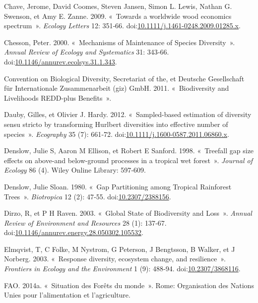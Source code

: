 \documentclass[11pt,french,A4paper,extrafontsizes,onecolumn,openright]{memoir}
\begin{document}
\hypertarget{ref-Chave2009}{}
Chave, Jerome, David Coomes, Steven Jansen, Simon L. Lewis, Nathan G.
Swenson, et Amy E. Zanne. 2009. «~Towards a worldwide wood economics
spectrum~». \emph{Ecology Letters} 12: 351‑66.
doi:\href{https://doi.org/10.1111/j.1461-0248.2009.01285.x}{10.1111/j.1461-0248.2009.01285.x}.

\hypertarget{ref-Chesson2000}{}
Chesson, Peter. 2000. «~Mechanisms of Maintenance of Species
Diversity~». \emph{Annual Review of Ecology and Systematics} 31: 343‑66.
doi:\href{https://doi.org/10.1146/annurev.ecolsys.31.1.343}{10.1146/annurev.ecolsys.31.1.343}.

\hypertarget{ref-CBDdiversity2011}{}
Convention on Biological Diversity, Secretariat of the, et Deutsche
Gesellschaft für Internationale Zusammenarbeit (giz) GmbH. 2011.
«~Biodiversity and Livelihoods REDD-plus Benefits~».

\hypertarget{ref-Dauby2012}{}
Dauby, Gilles, et Olivier J. Hardy. 2012. «~Sampled-based estimation of
diversity sensu stricto by transforming Hurlbert diversities into
effective number of species~». \emph{Ecography} 35 (7): 661‑72.
doi:\href{https://doi.org/10.1111/j.1600-0587.2011.06860.x}{10.1111/j.1600-0587.2011.06860.x}.

\hypertarget{ref-Denslow1998}{}
Denslow, Julie S, Aaron M Ellison, et Robert E Sanford. 1998. «~Treefall
gap size effects on above-and below-ground processes in a tropical wet
forest~». \emph{Journal of Ecology} 86 (4). Wiley Online Library:
597‑609.

\hypertarget{ref-Denslow1980}{}
Denslow, Julie Sloan. 1980. «~Gap Partitioning among Tropical Rainforest
Trees~». \emph{Biotropica} 12 (2): 47‑55.
doi:\href{https://doi.org/10.2307/2388156}{10.2307/2388156}.

\hypertarget{ref-Dirzo2003a}{}
Dirzo, R, et P H Raven. 2003. «~Global State of Biodiversity and Loss~».
\emph{Annual Review of Environment and Resources} 28 (1): 137‑67.
doi:\href{https://doi.org/10.1146/annurev.energy.28.050302.105532}{10.1146/annurev.energy.28.050302.105532}.

\hypertarget{ref-Elmqvist2003}{}
Elmqvist, T, C Folke, M Nystrom, G Peterson, J Bengtsson, B Walker, et J
Norberg. 2003. «~Response diversity, ecosystem change, and resilience~».
\emph{Frontiers in Ecology and the Environment} 1 (9): 488‑94.
doi:\href{https://doi.org/10.2307/3868116}{10.2307/3868116}.

\hypertarget{ref-FAO2009}{}
FAO. 2014a. «~Situation des Forêts du monde~». Rome: Organisation des
Nations Unies pour l'alimentation et l'agriculture.
\end{document}
